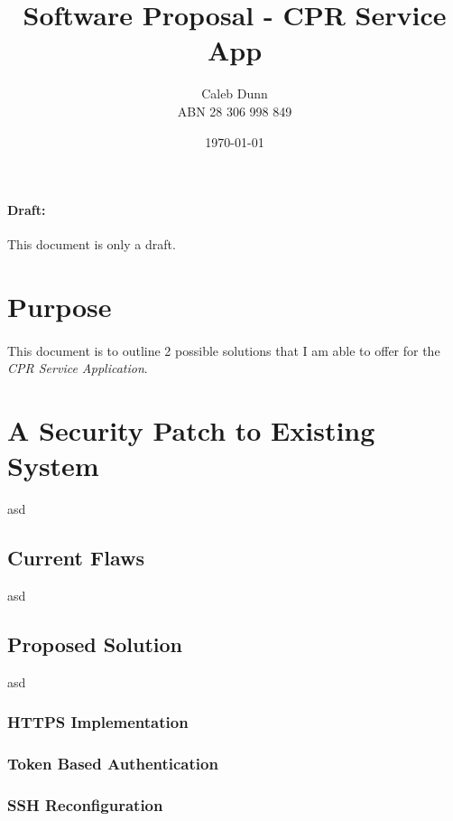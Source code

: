 \documentclass[12pt]{article}
\title{Software Proposal - CPR Service App}
\author{ Caleb Dunn \\ ABN 28 306 998 849}
\date{\today}
\begin{document}
    \maketitle

    \begin{center}
        \paragraph{Draft:}
        This document is only a draft.
    \end{center}

    \pagebreak


    \tableofcontents
    \pagebreak


    \section{Purpose}\label{sec:purpose}

    \paragraph{}
    This document is to outline 2 possible solutions that I am able to offer for the \emph{CPR Service Application}.

    \pagebreak
    \section{A Security Patch to Existing System}\label{sec:a-security-patch-to-existing-system}
    asd

    \subsection{Current Flaws}\label{subsec:current-flaws}
    asd

    \subsection{Proposed Solution}\label{subsec:proposed-solution}
    asd

    \subsubsection{HTTPS Implementation}
    \subsubsection{Token Based Authentication}
    \subsubsection{SSH Reconfiguration}
\end{document}
